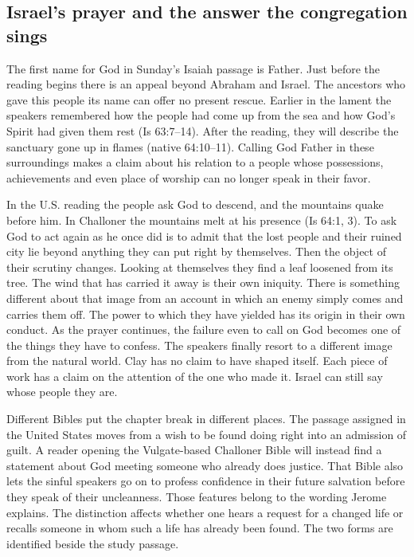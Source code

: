 \subsection{Israel's prayer and the answer the congregation sings}

The first name for God in Sunday's Isaiah passage is Father. Just before the reading begins there is an appeal beyond Abraham and Israel. The ancestors who gave this people its name can offer no present rescue. Earlier in the lament the speakers remembered how the people had come up from the sea and how God's Spirit had given them rest (Is 63:7--14). After the reading, they will describe the sanctuary gone up in flames (native 64:10--11). Calling God Father in these surroundings makes a claim about his relation to a people whose possessions, achievements and even place of worship can no longer speak in their favor.

In the U.S. reading the people ask God to descend, and the mountains quake before him. In Challoner the mountains melt at his presence (Is 64:1, 3). To ask God to act again as he once did is to admit that the lost people and their ruined city lie beyond anything they can put right by themselves. Then the object of their scrutiny changes. Looking at themselves they find a leaf loosened from its tree. The wind that has carried it away is their own iniquity. There is something different about that image from an account in which an enemy simply comes and carries them off. The power to which they have yielded has its origin in their own conduct. As the prayer continues, the failure even to call on God becomes one of the things they have to confess. The speakers finally resort to a different image from the natural world. Clay has no claim to have shaped itself. Each piece of work has a claim on the attention of the one who made it. Israel can still say whose people they are.

Different Bibles put the chapter break in different places. The passage assigned in the United States moves from a wish to be found doing right into an admission of guilt. A reader opening the Vulgate-based Challoner Bible will instead find a statement about God meeting someone who already does justice. That Bible also lets the sinful speakers go on to profess confidence in their future salvation before they speak of their uncleanness. Those features belong to the wording Jerome explains. The distinction affects whether one hears a request for a changed life or recalls someone in whom such a life has already been found. The two forms are identified beside the study passage.

